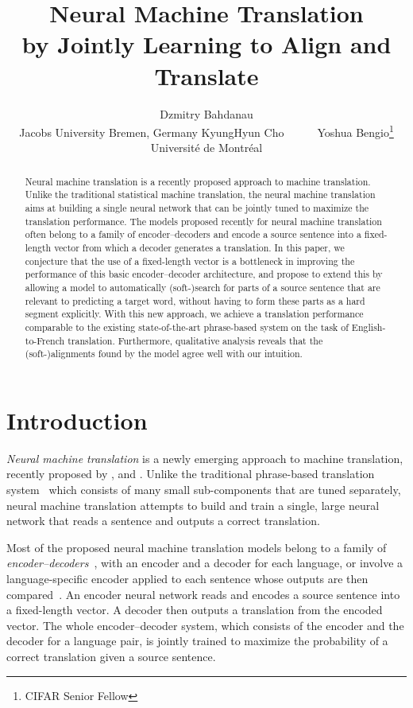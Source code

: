 \documentclass{article}
\title{Neural Machine Translation \\ by Jointly Learning to Align and Translate}
\author{
Dzmitry Bahdanau \\
Jacobs University Bremen, Germany
\And
KyungHyun Cho~ ~ ~ ~Yoshua Bengio\thanks{CIFAR Senior Fellow} \\
Universit\'{e} de Montr\'{e}al
}
\begin{document}
\maketitle

\begin{abstract}
    Neural machine translation is a recently proposed approach to machine
    translation. Unlike the traditional statistical machine translation, the
    neural machine translation aims at building a single neural network that
    can be jointly tuned to maximize the translation performance. The models
    proposed recently for neural machine translation often belong to a family
    of encoder--decoders and encode a source sentence into a fixed-length
    vector from which a decoder generates a translation. In this paper, we
    conjecture that the use of a fixed-length vector is a bottleneck in
    improving the performance of this basic encoder--decoder architecture, and
    propose to extend this by allowing a model to automatically
    \mbox{(soft-)search} for parts of a source sentence that are relevant to
    predicting a target word, without having to form these parts as a hard
    segment explicitly. With this new approach, we achieve a translation
    performance comparable to the existing state-of-the-art phrase-based system
    on the task of English-to-French translation. Furthermore, qualitative
    analysis reveals that the \mbox{(soft-)alignments} found by the model agree
    well with our intuition.
\end{abstract}

\section{Introduction}

{\it Neural machine translation} is a newly emerging approach to machine
translation, recently proposed by \citet{Kalchbrenner2013},
\citet{Sutskever2014} and \citet{Cho2014a}. Unlike the traditional phrase-based
translation system~\citep[see, e.g.,][]{Koehn2003} which consists of many small
sub-components that are tuned separately, neural machine translation attempts
to build and train a single, large neural network that reads a sentence and
outputs a correct translation. 

Most of the proposed neural machine translation models belong to a family of
{\it encoder--decoders}~\citep{Sutskever2014,Cho2014}, with an encoder and a
decoder for each language, or involve a language-specific encoder applied to
each sentence whose outputs are then compared~\citep{Hermann2014}.  An encoder
neural network reads and encodes a source sentence into a fixed-length vector.
A decoder then outputs a translation from the encoded vector. The whole
encoder--decoder system, which consists of the encoder and the decoder for a
language pair, is jointly trained to maximize the probability of a correct
translation given a source sentence.
\end{document}
